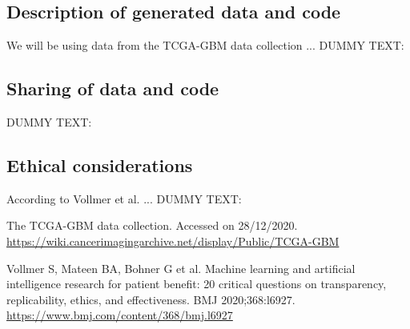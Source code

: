 \documentclass[11pt]{article}
\begin{document}
\subsection{Description of generated data and code}

We will be using data from the TCGA-GBM data collection \cite{TCGA-GBM} ...
DUMMY TEXT:
\lipsum[8]

\subsection{Sharing of data and code}

DUMMY TEXT:
\lipsum[9]

\subsection{Ethical considerations}

According to Vollmer et al. \cite{Vollmer2020} ...
DUMMY TEXT:
\lipsum[10]


\begin{footnotesize}
\begin{thebibliography}{2}

 The TCGA-GBM data collection. Accessed on 28/12/2020.\\ \scriptsize{\url{https://wiki.cancerimagingarchive.net/display/Public/TCGA-GBM}}

 Vollmer S, Mateen BA, Bohner G et al. Machine learning and artificial intelligence research for patient benefit: 20 critical questions on transparency, replicability, ethics, and effectiveness. BMJ 2020;368:l6927. \\
\scriptsize{\url{https://www.bmj.com/content/368/bmj.l6927}}


\end{thebibliography}
\end{footnotesize}
\end{document}
